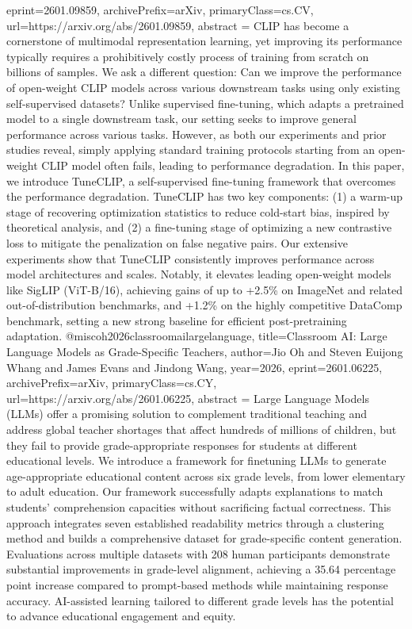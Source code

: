 {      eprint={2601.09859},
      archivePrefix={arXiv},
      primaryClass={cs.CV},
      url={https://arxiv.org/abs/2601.09859},
      abstract = {CLIP has become a cornerstone of multimodal representation learning, yet improving its performance typically requires a prohibitively costly process of training from scratch on billions of samples. We ask a different question: Can we improve the performance of open-weight CLIP models across various downstream tasks using only existing self-supervised datasets? Unlike supervised fine-tuning, which adapts a pretrained model to a single downstream task, our setting seeks to improve general performance across various tasks. However, as both our experiments and prior studies reveal, simply applying standard training protocols starting from an open-weight CLIP model often fails, leading to performance degradation. In this paper, we introduce TuneCLIP, a self-supervised fine-tuning framework that overcomes the performance degradation. TuneCLIP has two key components: (1) a warm-up stage of recovering optimization statistics to reduce cold-start bias, inspired by theoretical analysis, and (2) a fine-tuning stage of optimizing a new contrastive loss to mitigate the penalization on false negative pairs. Our extensive experiments show that TuneCLIP consistently improves performance across model architectures and scales. Notably, it elevates leading open-weight models like SigLIP (ViT-B/16), achieving gains of up to +2.5\% on ImageNet and related out-of-distribution benchmarks, and +1.2\% on the highly competitive DataComp benchmark, setting a new strong baseline for efficient post-pretraining adaptation.}
}@misc{oh2026classroomailargelanguage,
      title={Classroom AI: Large Language Models as Grade-Specific Teachers}, 
      author={Jio Oh and Steven Euijong Whang and James Evans and Jindong Wang},
      year={2026},
      eprint={2601.06225},
      archivePrefix={arXiv},
      primaryClass={cs.CY},
      url={https://arxiv.org/abs/2601.06225},
      abstract = {Large Language Models (LLMs) offer a promising solution to complement traditional teaching and address global teacher shortages that affect hundreds of millions of children, but they fail to provide grade-appropriate responses for students at different educational levels. We introduce a framework for finetuning LLMs to generate age-appropriate educational content across six grade levels, from lower elementary to adult education. Our framework successfully adapts explanations to match students' comprehension capacities without sacrificing factual correctness. This approach integrates seven established readability metrics through a clustering method and builds a comprehensive dataset for grade-specific content generation. Evaluations across multiple datasets with 208 human participants demonstrate substantial improvements in grade-level alignment, achieving a 35.64 percentage point increase compared to prompt-based methods while maintaining response accuracy. AI-assisted learning tailored to different grade levels has the potential to advance educational engagement and equity.}
}
